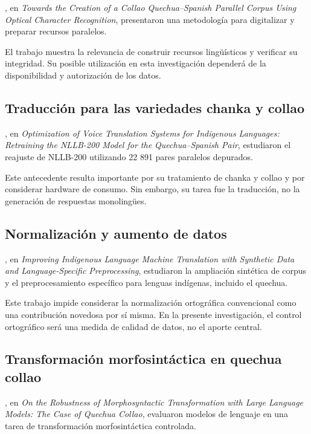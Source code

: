\textcite{Orcotoma2025}, en \emph{Towards the Creation of a Collao Quechua--Spanish Parallel Corpus Using Optical Character Recognition}, presentaron una metodología para digitalizar y preparar recursos paralelos.

El trabajo muestra la relevancia de construir recursos lingüísticos y verificar su integridad. Su posible utilización en esta investigación dependerá de la disponibilidad y autorización de los datos.

\subsection{Traducción para las variedades chanka y collao}\label{traducciuxf3n-para-las-variedades-chanka-y-collao}

\textcite{QuispeCallanaupa2026}, en \emph{Optimization of Voice Translation Systems for Indigenous Languages: Retraining the NLLB-200 Model for the Quechua--Spanish Pair}, estudiaron el reajuste de NLLB-200 utilizando 22 891 pares paralelos depurados.

Este antecedente resulta importante por su tratamiento de chanka y collao y por considerar hardware de consumo. Sin embargo, su tarea fue la traducción, no la generación de respuestas monolingües.

\subsection{Normalización y aumento de datos}\label{normalizaciuxf3n-y-aumento-de-datos}

\textcite{Dhawan2026}, en \emph{Improving Indigenous Language Machine Translation with Synthetic Data and Language-Specific Preprocessing}, estudiaron la ampliación sintética de corpus y el preprocesamiento específico para lenguas indígenas, incluido el quechua.

Este trabajo impide considerar la normalización ortográfica convencional como una contribución novedosa por sí misma. En la presente investigación, el control ortográfico será una medida de calidad de datos, no el aporte central.

\subsection{Transformación morfosintáctica en quechua collao}\label{transformaciuxf3n-morfosintuxe1ctica-en-quechua-collao}

\textcite{PoccoOncevay2026}, en \emph{On the Robustness of Morphosyntactic Transformation with Large Language Models: The Case of Quechua Collao}, evaluaron modelos de lenguaje en una tarea de transformación morfosintáctica controlada.

